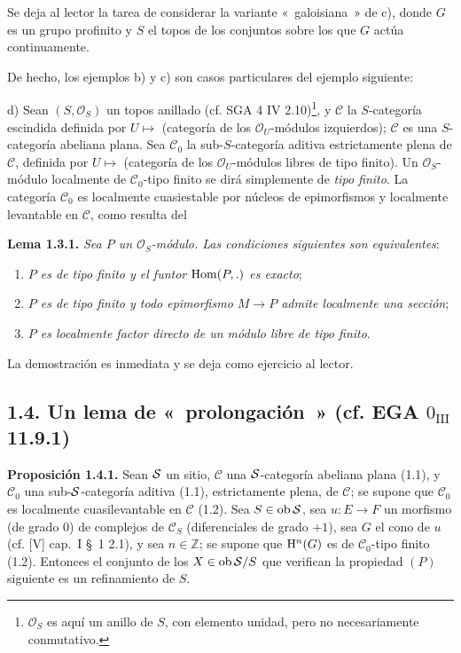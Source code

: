 Se deja al lector la tarea de considerar la variante «~galoisiana~» de c), donde \(G\) es un grupo profinito y \(S\) el topos de los conjuntos sobre los que \(G\) actúa continuamente.

De hecho, los ejemplos b) y c) son casos particulares del ejemplo siguiente:

d) Sean \((S,\mathcal O_S)\) un topos anillado (cf. SGA 4 IV 2.10)\footnote{\(\mathcal O_S\) es aquí un anillo de \(S\), con elemento unidad, pero no necesariamente conmutativo.}, y \(\mathcal C\) la \(S\)-categoría escindida definida por \(U\longmapsto\) (categoría de los \(\mathcal O_U\)-módulos izquierdos); \(\mathcal C\) es una \(S\)-categoría abeliana plana. Sea \(\mathcal C_0\) la sub-\(S\)-categoría aditiva estrictamente plena de \(\mathcal C\), definida por \(U\longmapsto\) (categoría de los \(\mathcal O_U\)-módulos libres de tipo finito). Un \(\mathcal O_S\)-módulo localmente de \(\mathcal C_0\)-tipo finito se dirá simplemente de \emph{tipo finito}. La categoría \(\mathcal C_0\) es localmente cuasiestable por núcleos de epimorfismos y localmente levantable en \(\mathcal C\), como resulta del

\textbf{Lema 1.3.1.} \emph{Sea \(P\) un \(\mathcal O_S\)-módulo. Las condiciones siguientes son equivalentes}:
\begin{enumerate}[label=(\roman*)]
\item \emph{\(P\) es de tipo finito y el funtor \(\Hom(P,.)\) es exacto};
\item \emph{\(P\) es de tipo finito y todo epimorfismo \(M\to P\) admite localmente una sección};
\item \emph{\(P\) es localmente factor directo de un módulo libre de tipo finito}.
\end{enumerate}
La demostración es inmediata y se deja como ejercicio al lector.

\subsection*{1.4. Un lema de «~prolongación~» (cf. EGA \(0_{\mathrm{III}}\) 11.9.1)}

\textbf{Proposición 1.4.1.} Sean \(\sisi{S}{\mathcal S}\) un sitio, \(\mathcal C\) una \(\sisi{S}{\mathcal S}\)-categoría abeliana plana (1.1), y \(\mathcal C_0\) una sub-\(\sisi{S}{\mathcal S}\)-categoría aditiva (1.1), estrictamente plena, de \(\mathcal C\); se supone que \(\mathcal C_0\) es localmente cuasilevantable en \(\mathcal C\) (1.2). Sea \(S\in\Ob \sisi{S}{\mathcal S}\), sea \(u:E\longrightarrow F\) un morfismo (de grado \(0\)) de complejos de \(\mathcal C_S\) (diferenciales de grado \(+1\)), sea \(G\) el cono de \(u\) (cf. [V] cap.\ I \S~1 2.1), y sea \(n\in\mathbb Z\); se supone que \(\Ho^n(G)\) es de \(\mathcal C_0\)-tipo finito (1.2). Entonces el conjunto de los \(X\in\Ob \sisi{S}{\mathcal S}/S\) que verifican la propiedad \((P)\) siguiente es un refinamiento de \(S\).

